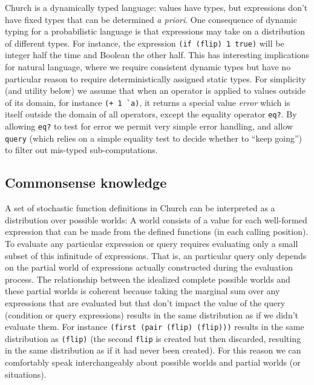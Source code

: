 \documentclass[pdfextras]{handbook}
\begin{document}
\label{bottom-val}
Church is a dynamically typed language: values have types, but expressions don't have fixed types that can be determined \emph{a priori}. 
One consequence of dynamic typing for a probabilistic language is that expressions may take on a distribution of different types. For instance, the expression \lstinline{(if (flip) 1 true)} will be integer half the time and Boolean the other half. This has interesting implications for natural language, where we require consistent dynamic types but have no particular reason to require deterministically assigned static types.
For simplicity (and utility below) we assume that when an operator is applied to values outside of its domain, for instance \lstinline{(+ 1 `a)}, it returns a special value \emph{error} which is itself outside the domain of all operators, except the equality operator \lstinline{eq?}. By allowing \lstinline{eq?} to test for error we permit very simple error handling, and allow \lstinline{query} (which relies on a simple equality test to decide whether to ``keep going'') to filter out mis-typed sub-computations.





\subsection{Commonsense knowledge}

A set of stochastic function definitions in Church can be interpreted as a distribution over possible worlds: A world consists of a value for each well-formed expression that can be made from the defined functions (in each calling position). 
To evaluate any particular expression or query requires evaluating only a small subset of this infinitude of expressions. 
That is, an particular query only depends on the partial world of expressions actually constructed during the evaluation process. 
The relationship between the idealized complete possible worlds and these partial worlds is coherent because taking the marginal sum over any expressions that are evaluated but that don't impact the value of the query (condition or query expressions) results in the same distribution as if we didn't evaluate them. For instance \lstinline{(first (pair (flip) (flip)))} results in the same distribution as \lstinline{(flip)} (the second \lstinline{flip} is created but then discarded, resulting in the same distribution as if it had never been created).
For this reason we can comfortably speak interchangeably about possible worlds and partial worlds (or situations).
\end{document}

